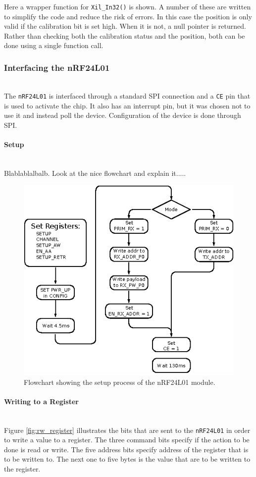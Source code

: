 Here a wrapper function for \texttt{Xil\_In32()} is shown.
A number of these are written to simplify the code and reduce the risk of errors.
In this case the position is only valid if the calibration bit is set high.
When it is not, a null pointer is returned.
Rather than checking both the calibration status and the position, both can be done using a single function call.

\subsubsection{Interfacing the nRF24L01} %
\label{ssubs:nrf24l01}
~\\
The \texttt{nRF24L01} is interfaced through a standard SPI connection and a \texttt{CE} pin that is used to activate the chip. 
It also has an interrupt pin, but it was chosen not to use it and instead poll the device. 
Configuration of the device is done through SPI.

\paragraph{Setup} %
\label{par:nrfsetup}
~\\
Blablablalbalb.
Look at the nice flowchart and explain it.....
\begin{figure}[h]
	\centering
	\includegraphics[width=.8\linewidth]{graphics/nfr_setup}
	\caption{Flowchart showing the setup process of the nRF24L01 module.}
	\label{fig:nrf_setup}
\end{figure}

\paragraph{Writing to a Register} %
\label{par:writing_to_a_register}
~\\
Figure \ref{fig:rw_register} illustrates the bits that are sent to the \texttt{nRF24L01} in order to write a value to a register. 
The three command bits specify if the action to be done is read or write.
The five address bits specify address of the register that is to be written to. 
The next one to five bytes is the value that are to be written to the register.

